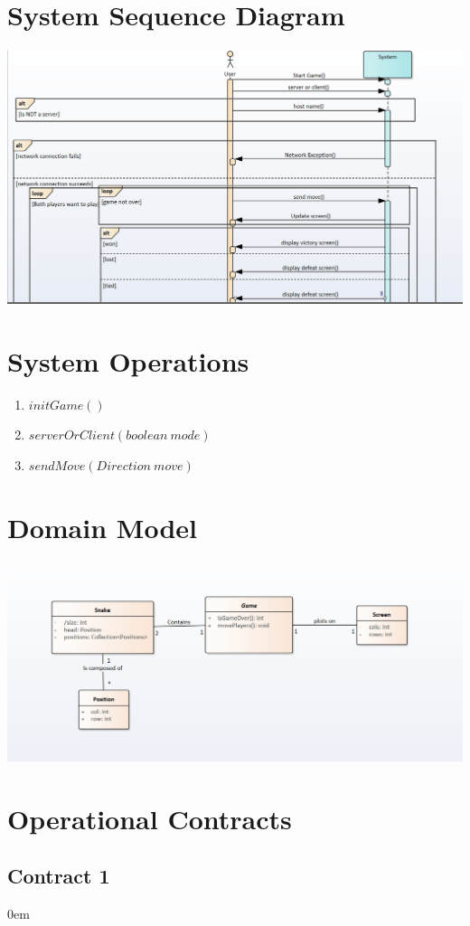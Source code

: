 \documentclass[titlepage]{article}
\begin{document}
	\section{System Sequence Diagram}
	\includegraphics[scale=.75]{SSD}
	
	\section{System Operations}
	\begin{enumerate}
		\item $initGame()$
		\item $serverOrClient(boolean~mode)$
		\item $sendMove(Direction~move)$
	\end{enumerate}
	
	\section{Domain Model}
		\includegraphics[scale=.75]{DM}
	
	\section{Operational Contracts}
	\subsection{Contract 1}
	\itemsep0em 
	
\end{document}
